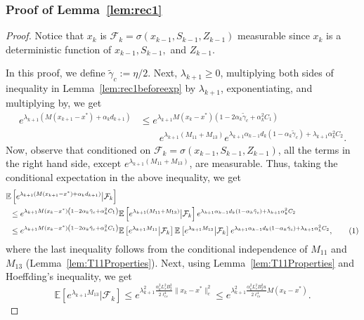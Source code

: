 \documentclass{article}
\newcommand{\numberthis}{\addtocounter{equation}{1}\tag{\theequation}}
\newcommand{\lrp}[1]{\left( #1 \right)}
\newcommand{\lrs}[1]{\left[ #1 \right]}
\newcommand{\E}[1]{\mathbb{E}\lrs{#1}}
\newcommand{\lcs}{\ell_{cs}}
\newcommand{\xk}{x_k}
\begin{document}
\subsubsection{Proof of Lemma~\ref{lem:rec1}}\label{app:proof_lem:rec1}
\begin{proof} 
    Notice that $x_k$ is $\mathcal F_k = \sigma(x_{k-1},S_{k-1}, Z_{k-1})$ measurable since $x_k$ is a deterministic function of $x_{k-1}, S_{k-1}, $ and $Z_{k-1}$.
    
    In this proof, we define $\tilde{\gamma}_c := \eta/2$. Next, $\lambda_{k+1} \ge 0$, multiplying both sides of inequality in Lemma~\ref{lem:rec1beforeexp} by $\lambda_{k+1}$, exponentiating, and multiplying by, we get
    \begin{align*}
        e^{\lambda_{k+1}\lrp{M(x_{k+1} - x^*) + \alpha_k d_{k+1}}} 
        &\le e^{\lambda_{k+1} M(\xk - x^*) \lrp{1 - 2\alpha_k\tilde{\gamma}_c + \alpha^2_k C_1 }} \\
            &\qquad e^{\lambda_{k+1} (M_{11}+M_{13})} e^{\lambda_{k+1} \alpha_{k-1}d_k (1-\alpha_k \tilde{\gamma}_c) + \lambda_{k+1}\alpha^2_k C_2}.
    \end{align*}
    Now, observe that conditioned on $\mathcal F_k = \sigma(x_{k-1}, S_{k-1}, Z_{k-1})$, all the terms in the right hand side, except $e^{\lambda_{k+1}(M_{11}+M_{13})}$, are measurable. Thus, taking the conditional expectation in the above inequality, we get
    \begin{align*}
        &\E{e^{\lambda_{k+1}\lrp{M(x_{k+1} - x^*) + \alpha_k d_{k+1}}} \big| \mathcal F_k } \\
        &\,\,\,\le e^{\lambda_{k+1}M(\xk - x^*) \lrp{1 - 2\alpha_k\tilde{\gamma}_c + \alpha^2_k C_1 }} \E{e^{\lambda_{k+1} (M_{11}+M_{13})} \big| \mathcal F_k} e^{\lambda_{k+1}\alpha_{k-1}d_k (1-\alpha_k \tilde{\gamma}_c) + \lambda_{k+1}\alpha^2_k C_2} \\
        &\,\,\, \le e^{\lambda_{k+1}M(\xk - x^*) \lrp{1 - 2\alpha_k\tilde{\gamma}_c + \alpha^2_k C_1 }} \E{e^{\lambda_{k+1} M_{11}} \big| \mathcal F_k} \E{e^{\lambda_{k+1} M_{13}} \big| \mathcal F_k} e^{\lambda_{k+1}\alpha_{k-1}d_k (1-\alpha_k \tilde{\gamma}_c) + \lambda_{k+1}\alpha^2_k C_2},\numberthis\label{eq:boundcondexp}
    \end{align*}
    where the last inequality follows from the conditional independence of $M_{11}$ and $M_{13}$ (Lemma~\ref{lem:T11Properties}). Next, using Lemma~\ref{lem:T11Properties} and Hoeffding's inequality, we get
    \[ \E{ e^{\lambda_{k+1} M_{13}} \big| \mathcal F_k} \le e^{\lambda^2_{k+1} \frac{\alpha^2_k L^2_s B^2_2}{2 \lcs^4} \|x_k - x^*\|^2_c  } \le  e^{\lambda^2_{k+1} \frac{\alpha^2_k L^2_s B^2_2 u}{2 \lcs^4} M(x_k - x^*)  }. \]

\end{proof}
\end{document}
